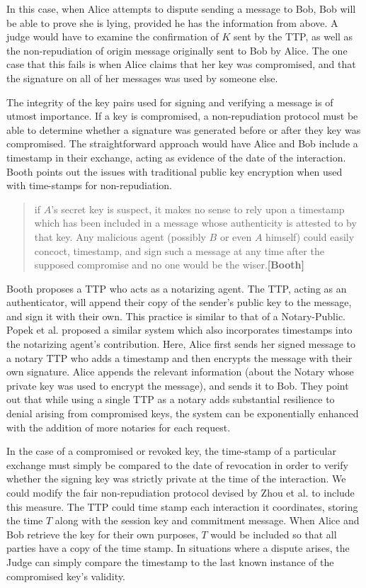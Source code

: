 \documentclass[12pt]{article}
\newcommand{\lcite}[1]
{{\bfseries\color{orange}[#1]}}
\begin{document}
			In this case, when Alice attempts to dispute sending a message to Bob, Bob will be able to prove she is lying, provided he has the information from above. A judge would have to examine the confirmation of $K$ sent by the TTP, as well as the non-repudiation of origin message originally sent to Bob by Alice. The one case that this fails is when Alice claims that her key was compromised, and that the signature on all of her messages was used by someone else\cite{zhou1996fair}.

			The integrity of the key pairs used for signing and verifying a message is of utmost importance. If a key is compromised, a non-repudiation protocol must be able to determine whether a signature was generated before or after they key was compromised. The straightforward approach would have Alice and Bob include a timestamp in their exchange, acting as evidence of the date of the interaction. Booth points out the issues with traditional public key encryption when used with time-stamps for non-repudiation.
			\begin{quote}
				if $A$'s secret key is suspect, it makes no sense to rely upon a timestamp which has been included in a message whose authenticity is attested to by that key. Any malicious agent (possibly $B$ or even $A$ himself) could easily concoct, timestamp, and sign such a message at any time after the supposed compromise and no one would be the wiser.\lcite{Booth}
			\end{quote}

			Booth proposes a TTP who acts as a notarizing agent. The TTP, acting as an authenticator, will append their copy of the sender's public key to the message, and sign it with their own. This practice is similar to that of a Notary-Public. Popek et al. proposed a similar system which also incorporates timestamps into the notarizing agent's contribution. Here, Alice first sends her signed message to a notary TTP who adds a timestamp and then encrypts the message with their own signature. Alice appends the relevant information (about the Notary whose private key was used to encrypt the message), and sends it to Bob\cite{kline1899public}. They point out that while using a single TTP as a notary adds substantial resilience to denial arising from compromised keys, the system can be exponentially enhanced with the addition of more notaries for each request.

			In the case of a compromised or revoked key, the time-stamp of a particular exchange must simply be compared to the date of revocation in order to verify whether the signing key was strictly private at the time of the interaction. We could modify the fair non-repudiation protocol devised by Zhou et al. to include this measure. The TTP could time stamp each interaction it coordinates, storing the time $T$ along with the session key and commitment message. When Alice and Bob retrieve the key for their own purposes, $T$ would be included so that all parties have a copy of the time stamp. In situations where a dispute arises, the Judge can simply compare the timestamp to the last known instance of the compromised key's validity.
\end{document}
